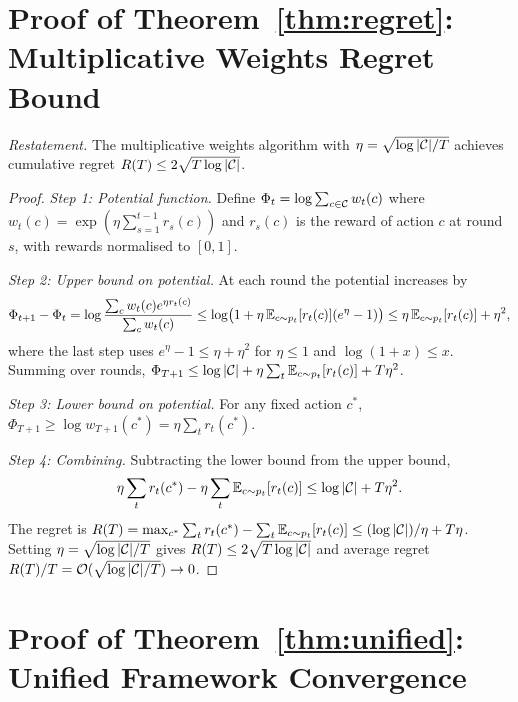 \section{Proof of Theorem~\ref{thm:regret}: Multiplicative Weights Regret Bound}
\label{app:proof_regret}

\noindent\textit{Restatement.} The multiplicative weights algorithm with $\eta=\sqrt{\log|\mathcal{C}|/T}$ achieves cumulative regret $R(T)\le 2\sqrt{T\log|\mathcal{C}|}$.

\begin{proof}
\textit{Step 1: Potential function.} Define $\Phi_t = \log\sum_{c\in\mathcal{C}}w_t(c)$ where $w_t(c) = \exp(\eta\sum_{s=1}^{t-1}r_s(c))$ and $r_s(c)$ is the reward of action $c$ at round $s$, with rewards normalised to $[0,1]$.

\textit{Step 2: Upper bound on potential.} At each round the potential increases by
\begin{equation}
\Phi_{t+1}-\Phi_t = \log\frac{\sum_c w_t(c)e^{\eta r_t(c)}}{\sum_c w_t(c)}
\le \log\bigl(1+\eta\,\mathbb{E}_{c\sim p_t}[r_t(c)](e^\eta-1)\bigr)
\le \eta\,\mathbb{E}_{c\sim p_t}[r_t(c)] + \eta^2,
\end{equation}
where the last step uses $e^\eta-1\le\eta+\eta^2$ for $\eta\le 1$ and $\log(1+x)\le x$. Summing over rounds, $\Phi_{T+1}\le\log|\mathcal{C}|+\eta\sum_t\mathbb{E}_{c\sim p_t}[r_t(c)]+T\eta^2$.

\textit{Step 3: Lower bound on potential.} For any fixed action $c^*$, $\Phi_{T+1}\ge\log w_{T+1}(c^*) = \eta\sum_t r_t(c^*)$.

\textit{Step 4: Combining.} Subtracting the lower bound from the upper bound,
\begin{equation}
\eta\sum_t r_t(c^*) - \eta\sum_t\mathbb{E}_{c\sim p_t}[r_t(c)] \le \log|\mathcal{C}| + T\eta^2.
\end{equation}
The regret is $R(T) = \max_{c^*}\sum_t r_t(c^*) - \sum_t\mathbb{E}_{c\sim p_t}[r_t(c)] \le (\log|\mathcal{C}|)/\eta + T\eta$. Setting $\eta=\sqrt{\log|\mathcal{C}|/T}$ gives $R(T)\le 2\sqrt{T\log|\mathcal{C}|}$ and average regret $R(T)/T = \mathcal{O}(\sqrt{\log|\mathcal{C}|/T})\to 0$.
\end{proof}


\section{Proof of Theorem~\ref{thm:unified}: Unified Framework Convergence}
\label{app:proof_unified}

